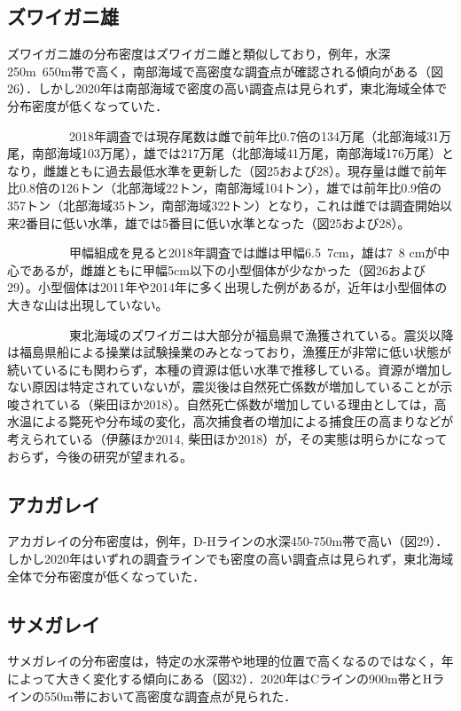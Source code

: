\documentclass[11pt]{article} %
\begin{document}
\begin{linenumbers}
\subsection{ズワイガニ雄}
ズワイガニ雄の分布密度はズワイガニ雌と類似しており，例年，水深250m~650m帯で高く，南部海域で高密度な調査点が確認される傾向がある（図26）．しかし2020年は南部海域で密度の高い調査点は見られず，東北海域全体で分布密度が低くなっていた．

\ \ \ \ \ \ \ \ \ \ 
2018年調査では現存尾数は雌で前年比0.7倍の134万尾（北部海域31万尾，南部海域103万尾），雄では217万尾（北部海域41万尾，南部海域176万尾）となり，雌雄ともに過去最低水準を更新した（図25および28）。現存量は雌で前年比0.8倍の126トン（北部海域22トン，南部海域104トン），雄では前年比0.9倍の357トン（北部海域35トン，南部海域322トン）となり，これは雌では調査開始以来2番目に低い水準，雄では5番目に低い水準となった（図25および28）。

\ \ \ \ \ \ \ \ \ \ 
甲幅組成を見ると2018年調査では雌は甲幅6.5~7cm，雄は7~8 cmが中心であるが，雌雄ともに甲幅5cm以下の小型個体が少なかった（図26および29）。小型個体は2011年や2014年に多く出現した例があるが，近年は小型個体の大きな山は出現していない。

\ \ \ \ \ \ \ \ \ \ 
東北海域のズワイガニは大部分が福島県で漁獲されている。震災以降は福島県船による操業は試験操業のみとなっており，漁獲圧が非常に低い状態が続いているにも関わらず，本種の資源は低い水準で推移している。資源が増加しない原因は特定されていないが，震災後は自然死亡係数が増加していることが示唆されている（柴田ほか2018）。自然死亡係数が増加している理由としては，高水温による斃死や分布域の変化，高次捕食者の増加による捕食圧の高まりなどが考えられている（伊藤ほか2014, 柴田ほか2018）が，その実態は明らかになっておらず，今後の研究が望まれる。

\subsection{アカガレイ}
アカガレイの分布密度は，例年，D-Hラインの水深450-750m帯で高い（図29）．しかし2020年はいずれの調査ラインでも密度の高い調査点は見られず，東北海域全体で分布密度が低くなっていた．



\subsection{サメガレイ}
サメガレイの分布密度は，特定の水深帯や地理的位置で高くなるのではなく，年によって大きく変化する傾向にある（図32）．2020年はCラインの900m帯とHラインの550m帯において高密度な調査点が見られた．


\end{linenumbers}
\end{document}

